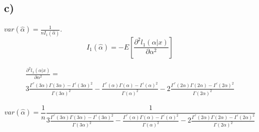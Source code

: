 \documentclass{article}
\begin{document}
\subsection*{c)}
$var(\hat{\alpha}) = \frac{1}{nI_1(\hat{\alpha})}$.
\begin{equation*}
I_1(\hat{\alpha}) = -E\left[  \frac{\partial^2l_1(\alpha|x)}{\partial \alpha^2}   \right]
\end{equation*}

\begin{equation*}
\begin{split}
\frac{\partial^2l_1(\alpha|x)}{\partial \alpha^2} =\\  3\frac{\Gamma^{''}(3\alpha)\Gamma(3\alpha) - \Gamma^{'}(3\alpha)^2}{\Gamma(3\alpha)^2} -
\frac{\Gamma^{''}(\alpha)\Gamma(\alpha) - \Gamma^{'}(\alpha)^2}{\Gamma(\alpha)^2} -
2\frac{\Gamma^{''}(2\alpha)\Gamma(2\alpha) - \Gamma^{'}(2\alpha)^2}{\Gamma(2\alpha)^2}
\end{split}
\end{equation*}

\begin{equation*}
var(\hat{\alpha}) =\frac{1}{n} \frac{1}{ 3\frac{\Gamma^{''}(3\alpha)\Gamma(3\alpha) - \Gamma^{'}(3\alpha)^2}{\Gamma(3\alpha)^2} -
\frac{\Gamma^{''}(\alpha)\Gamma(\alpha) - \Gamma^{'}(\alpha)^2}{\Gamma(\alpha)^2} -
2\frac{\Gamma^{''}(2\alpha)\Gamma(2\alpha) - \Gamma^{'}(2\alpha)^2}{\Gamma(2\alpha)^2}}
\end{equation*}
\end{document}

